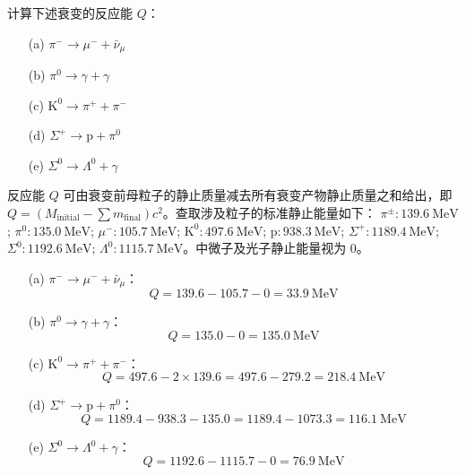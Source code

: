 \begin{exercise}\label{ex:30.14}
计算下述衰变的反应能 $Q$：
\begin{enumerate}
  \item[(a)] $\pi^- \rightarrow \mu^- + \bar{\nu}_\mu$
  \item[(b)] $\pi^0 \rightarrow \gamma + \gamma$
  \item[(c)] $\mathrm{K}^0 \rightarrow \pi^+ + \pi^-$
  \item[(d)] $\Sigma^+ \rightarrow \mathrm{p} + \pi^0$
  \item[(e)] $\Sigma^0 \rightarrow \Lambda^0 + \gamma$
\end{enumerate}
\end{exercise}
\begin{solution}
反应能 $Q$ 可由衰变前母粒子的静止质量减去所有衰变产物静止质量之和给出，即 $Q = (M_{\text{initial}} - \sum m_{\text{final}}) c^2$。查取涉及粒子的标准静止能量如下：
$\pi^\pm: 139.6 \ \mathrm{MeV}$; $\pi^0: 135.0 \ \mathrm{MeV}$; $\mu^-: 105.7 \ \mathrm{MeV}$; $\mathrm{K}^0: 497.6 \ \mathrm{MeV}$;
$\mathrm{p}: 938.3 \ \mathrm{MeV}$; $\Sigma^+: 1189.4 \ \mathrm{MeV}$; $\Sigma^0: 1192.6 \ \mathrm{MeV}$; $\Lambda^0: 1115.7 \ \mathrm{MeV}$。中微子及光子静止能量视为 $0$。

\begin{enumerate}
    \item[(a)] $\pi^- \rightarrow \mu^- + \bar{\nu}_\mu$：
    $$ Q = 139.6 - 105.7 - 0 = 33.9 \ \mathrm{MeV} $$
    \item[(b)] $\pi^0 \rightarrow \gamma + \gamma$：
    $$ Q = 135.0 - 0 = 135.0 \ \mathrm{MeV} $$
    \item[(c)] $\mathrm{K}^0 \rightarrow \pi^+ + \pi^-$：
    $$ Q = 497.6 - 2 \times 139.6 = 497.6 - 279.2 = 218.4 \ \mathrm{MeV} $$
    \item[(d)] $\Sigma^+ \rightarrow \mathrm{p} + \pi^0$：
    $$ Q = 1189.4 - 938.3 - 135.0 = 1189.4 - 1073.3 = 116.1 \ \mathrm{MeV} $$
    \item[(e)] $\Sigma^0 \rightarrow \Lambda^0 + \gamma$：
    $$ Q = 1192.6 - 1115.7 - 0 = 76.9 \ \mathrm{MeV} $$
\end{enumerate}
\end{solution}

